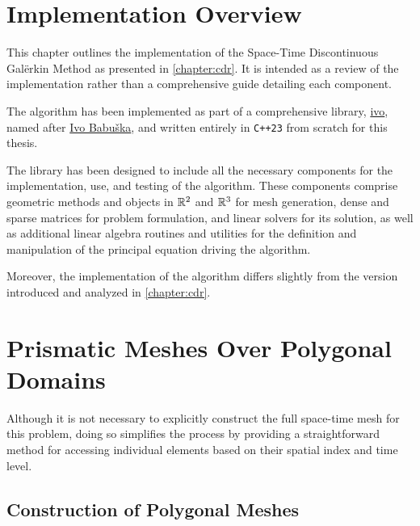 \section{Implementation Overview}

This chapter outlines the implementation of the Space-Time Discontinuous Galërkin Method as presented in \cref{chapter:cdr}. It is intended as a review of the implementation rather than a comprehensive guide detailing each component.

The algorithm has been implemented as part of a comprehensive library, \href{https://github.com/diantonioandrea/ivo}{ivo}, named after \href{https://en.wikipedia.org/wiki/Ivo_Babuška}{Ivo Babuška}, and written entirely in \lstinline{C++23} from scratch for this thesis.

The library has been designed to include all the necessary components for the implementation, use, and testing of the algorithm. These components comprise geometric methods and objects in $\mathbb{R}^{2}$ and $\mathbb{R}^{3}$ for mesh generation, dense and sparse matrices for problem formulation, and linear solvers for its solution, as well as additional linear algebra routines and utilities for the definition and manipulation of the principal equation driving the algorithm.

Moreover, the implementation of the algorithm differs slightly from the version introduced and analyzed in \cref{chapter:cdr}.

\newpage
\section{Prismatic Meshes Over Polygonal Domains} \label{section:mesh}

Although it is not necessary to explicitly construct the full space-time mesh for this problem, doing so simplifies the process by providing a straightforward method for accessing individual elements based on their spatial index and time level. 

\subsection{Construction of Polygonal Meshes} \label{subsection:pol_mesh}

%         
%         

